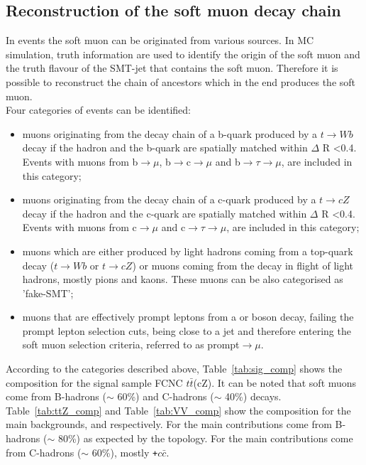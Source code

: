\subsection {Reconstruction of the soft muon decay chain}
\label{sec:smt_compositions}
In \ttbar events the soft muon can be originated from various sources. In MC simulation, truth information are used to identify the origin of the soft muon and the truth flavour of the SMT-jet that contains the soft muon. Therefore it is possible to reconstruct the chain of ancestors which in the end produces the soft muon. \\
Four categories of events can be identified:
\begin{itemize}
	\item muons originating from the decay chain of a b-quark produced by a $t\rightarrow Wb$ decay if the hadron and the b-quark are spatially matched within $\Delta$ R <0.4. Events with muons from b$\rightarrow \mu$, b$\rightarrow$c$\rightarrow \mu$ and b$\rightarrow \tau \rightarrow \mu$, are included in this category;
	\item muons originating from the decay chain of a c-quark produced by a $t\rightarrow cZ$ decay if the hadron and the c-quark are spatially matched within $\Delta$ R <0.4. Events with muons from c$\rightarrow \mu$ and c$\rightarrow \tau \rightarrow \mu$,   are included in this category;
	\item muons which are either produced by light hadrons coming from a top-quark decay ($t\rightarrow Wb$ or $t\rightarrow cZ$) or muons coming from the decay in flight of light hadrons, mostly pions and kaons. These muons can be also categorised as 'fake-SMT';
	\item muons that are effectively prompt leptons from a \PW or \PZ boson decay, failing the prompt lepton selection cuts, being close to a jet and therefore entering the soft muon selection criteria, referred to as prompt$\rightarrow \mu$.
\end{itemize}
According to the categories described above, Table~\ref{tab:sig_comp} shows the composition for the signal sample FCNC $t\bar{t}$(cZ). It can be noted that soft muons come from B-hadrons ($\sim$ 60\%)  and C-hadrons ($\sim$ 40\%) decays.
Table~\ref{tab:ttZ_comp} and Table~\ref{tab:VV_comp} show the composition for the main backgrounds, \ttZ and \VVHF respectively. 
For \ttZ the main contributions come from B-hadrons ($\sim$ 80\%) as expected by the \ttZ topology.
For \VVHF the main contributions come from C-hadrons ($\sim$ 60\%), mostly  \WZ\texttt{+$c\bar{c}$}.

